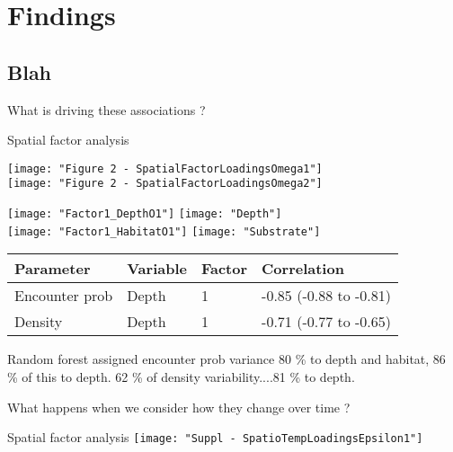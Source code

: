 \documentclass[xcolor=x11names,compress]{beamer}
\renewcommand{\(}{\begin{columns}}
\renewcommand{\)}{\end{columns}}
\newcommand{\<}[1]{\begin{column}{#1}}
\renewcommand{\>}{\end{column}}
\begin{document}
\section{Findings}
\subsection{Blah}

\begin{frame}
	What is driving these associations ?
\end{frame}

\begin{frame}{Spatial factor analysis}

\centering
\texttt{[image: "Figure 2 - SpatialFactorLoadingsOmega1"]}
\\
\texttt{[image: "Figure 2 - SpatialFactorLoadingsOmega2"]}
	
\end{frame}

\begin{frame}{}
\centering
\texttt{[image: "Factor1\_DepthO1"]}
\texttt{[image: "Depth"]} \\
\texttt{[image: "Factor1\_HabitatO1"]}
\texttt{[image: "Substrate"]}

\begin{table}
	\begin{tabular}{p{1.5cm} p{1cm} p{1cm} p{2cm}}
		\hline
		Parameter & Variable & Factor & Correlation \\
		\hline
		Encounter prob & Depth  & 1 & -0.85 (-0.88 to -0.81) \\
		Density & Depth & 1 & -0.71 (-0.77 to -0.65) \\
		\hline
	\end{tabular}
\end{table}

\tiny
Random forest assigned encounter prob variance 80 \% to depth and habitat, 86 \% of this to
depth. 62 \% of density variability....81 \% to depth.

\end{frame}

\begin{frame}
        What happens when we consider how they change over time ?	
\end{frame}

\begin{frame}{Spatial factor analysis}
\centering
\texttt{[image: "Suppl - SpatioTempLoadingsEpsilon1"]}
\end{frame}
\end{document}
